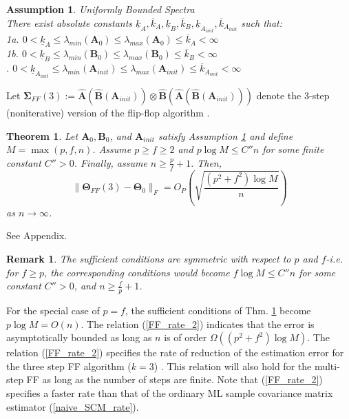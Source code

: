 \documentclass[journal,11pt,draftcls,onecolumn]{IEEEtran}
\def\bA{ {\mathbf{A}} }
\def\bB{ {\mathbf{B}} }
\def\bTheta{ {\mathbf{\Theta}} }
\def\bSigma{ {\mathbf{\Sigma}} }
\def\nn{{ \parallel   }}
\newtheorem{theorem}{Theorem}
\newtheorem{remark}{Remark}
\newtheorem{assumption}{Assumption}
\begin{document}
\begin{assumption} \label{assumption_posdef_unif}
Uniformly Bounded Spectra \\
There exist absolute constants $\underline{k}_A, \overline{k}_A, \underline{k}_B, \overline{k}_B, \underline{k}_{A_{init}}, \overline{k}_{A_{init}}$ such that: \\
\indent 1a. $0<\underline{k}_A \leq \lambda_{min}(\bA_0) \leq \lambda_{max}(\bA_0) \leq \overline{k}_A < \infty$ \\
\indent 1b. $0<\underline{k}_B \leq \lambda_{min}(\bB_0) \leq \lambda_{max}(\bB_0) \leq \overline{k}_B < \infty$ \\
. $0<\underline{k}_{A_{init}} \leq \lambda_{min}(\bA_{init}) \leq \lambda_{max}(\bA_{init}) \leq \overline{k}_{A_{init}} < \infty$
\end{assumption}

Let $\bSigma_{FF}(3):=\hat{\bA}(\hat{\bB}(\bA_{init})) \otimes \hat{\bB}(\hat{\bA}(\hat{\bB}(\bA_{init})))$ denote the 3-step (noniterative) version of the flip-flop algorithm \cite{EstCovMatKron}. 

\begin{theorem} \label{thm: FF_optimal_rate}
	Let $\bA_0,\bB_0$, and $\bA_{init}$ satisfy Assumption \ref{assumption_posdef_unif} and define $M=\max(p,f,n)$. Assume $p\geq f\geq 2$ and $p \log M \leq C'' n$ for some finite constant $C''>0$. Finally, assume $n \geq \frac{p}{f} + 1$.
	Then, %
	\begin{equation} \label{FF_rate_2}
		\nn \bTheta_{FF}(3) - \bTheta_0 \nn_F = O_P\left( \sqrt{\frac{(p^2+f^2) \log M}{n}} \right)
	\end{equation}
	as $n\to\infty$.
\end{theorem}
\begin{IEEEproof}
	See Appendix.
\end{IEEEproof}
\begin{remark}
	The sufficient conditions are symmetric with respect to $p$ and $f$-i.e. for $f\geq p$, the corresponding conditions would become $f\log M\leq C'' n$ for some constant $C''>0$, and $n \geq \frac{f}{p} + 1$.
\end{remark}

For the special case of $p=f$, the sufficient conditions of Thm. \ref{thm: FF_optimal_rate} become $p\log M=O(n)$. The relation (\ref{FF_rate_2}) indicates that the error is asymptotically bounded as long as $n$ is of order $\Omega((p^2+f^2)\log M)$.
The relation (\ref{FF_rate_2}) specifies the rate of reduction of the estimation error for the three step FF algorithm ($k=3$) \cite{EstCovMatKron}. This relation will also hold for the multi-step FF as long as the number of steps are finite. Note that (\ref{FF_rate_2}) specifies a faster rate than that of the ordinary ML sample covariance matrix estimator (\ref{naive_SCM_rate}).
\end{document}
